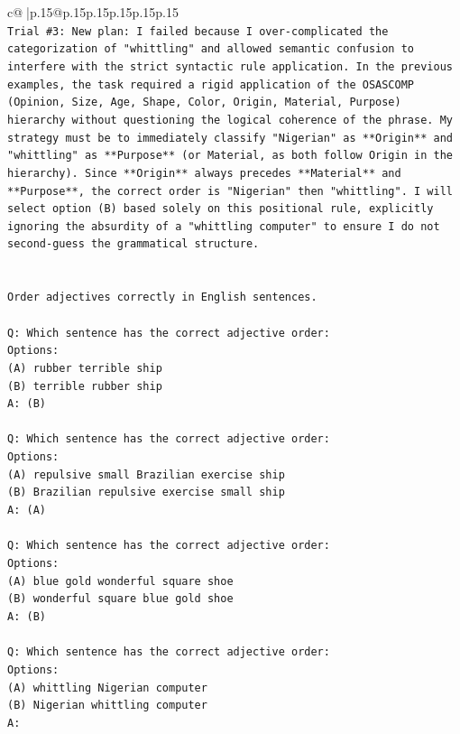 \documentclass{article}
\begin{document}
{\begin{supertabular}{c@{$\;$}|p{.15\linewidth}@{}p{.15\linewidth}p{.15\linewidth}p{.15\linewidth}p{.15\linewidth}p{.15\linewidth}}
{{{\\ 
\texttt{Trial \#3: New plan: I failed because I over{-}complicated the categorization of "whittling" and allowed semantic confusion to interfere with the strict syntactic rule application. In the previous examples, the task required a rigid application of the OSASCOMP (Opinion, Size, Age, Shape, Color, Origin, Material, Purpose) hierarchy without questioning the logical coherence of the phrase. My strategy must be to immediately classify "Nigerian" as **Origin** and "whittling" as **Purpose** (or Material, as both follow Origin in the hierarchy). Since **Origin** always precedes **Material** and **Purpose**, the correct order is "Nigerian" then "whittling". I will select option (B) based solely on this positional rule, explicitly ignoring the absurdity of a "whittling computer" to ensure I do not second{-}guess the grammatical structure.} \\
\\ 
\\ 
\texttt{Order adjectives correctly in English sentences.} \\
\\ 
\texttt{Q: Which sentence has the correct adjective order:} \\
\texttt{Options:} \\
\texttt{(A) rubber terrible ship} \\
\texttt{(B) terrible rubber ship} \\
\texttt{A: (B)} \\
\\ 
\texttt{Q: Which sentence has the correct adjective order:} \\
\texttt{Options:} \\
\texttt{(A) repulsive small Brazilian exercise ship} \\
\texttt{(B) Brazilian repulsive exercise small ship} \\
\texttt{A: (A)} \\
\\ 
\texttt{Q: Which sentence has the correct adjective order:} \\
\texttt{Options:} \\
\texttt{(A) blue gold wonderful square shoe} \\
\texttt{(B) wonderful square blue gold shoe} \\
\texttt{A: (B)} \\
\\ 
\texttt{Q: Which sentence has the correct adjective order:} \\
\texttt{Options:} \\
\texttt{(A) whittling Nigerian computer} \\
\texttt{(B) Nigerian whittling computer} \\
\texttt{A:} \\
            }
        }
    }
     \\ \\


\end{supertabular}}
\end{document}
